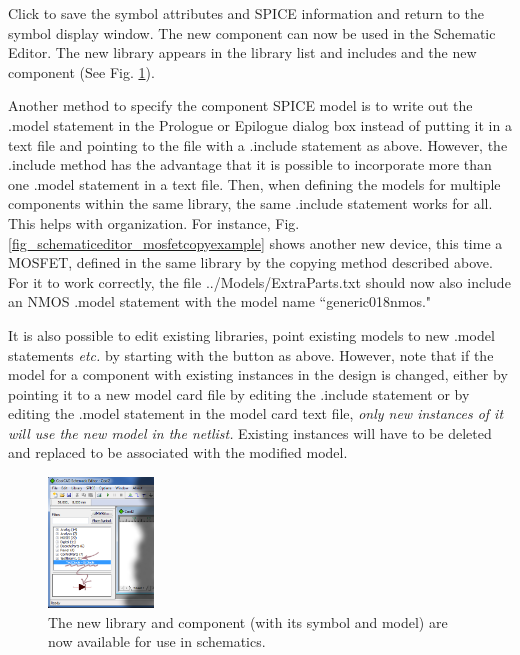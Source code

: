 Click  to save the symbol attributes and SPICE information and return to the symbol display window. The new component can now be used in the Schematic Editor. The new library appears in the library list and includes and the new component (See Fig. \ref{fig_schematiceditor_newdeviceavailable}). 

Another method to specify the component SPICE model is to write out the \textsf{.model} statement in the \textsf{Prologue} or \textsf{Epilogue} dialog box instead of putting it in a text file and pointing to the file with a \textsf{.include} statement as above.  However, the \textsf{.include} method has the advantage that it is possible to incorporate more than one \textsf{.model} statement in a text file.  Then, when defining the models for multiple components within the same library, the same \textsf{.include} statement works for all. This helps with organization.  For instance, Fig. \ref{fig_schematiceditor_mosfetcopyexample} shows another new device, this time a MOSFET, defined in the same library by the copying method described above.  For it to work correctly, the file \textsf{../Models/ExtraParts.txt} should now also include an NMOS \textsf{.model} statement with the model name ``generic018nmos."

It is also possible to edit existing libraries, point existing models to new \textsf{.model} statements \textit{etc.} by starting with the  button as above. However,  note that if the model for a component with existing instances in the design is changed, either by pointing it to a new model card file by editing the \textsf{.include} statement or by editing the \textsf{.model} statement in the model card text file, \textit{only new instances of it will use the new model in the netlist.}  Existing instances will have to be deleted and replaced to be associated with the modified model.   


\begin{figure}
	\includegraphics[width=0.25\textwidth]
	{./figures/getting_started_figures/SchematicEditor_NewLibraryDeviceAvailable.png}
  \caption{The new library and component (with its symbol and model) are now available for use in schematics.}
  \label{fig_schematiceditor_newdeviceavailable}
\end{figure}

